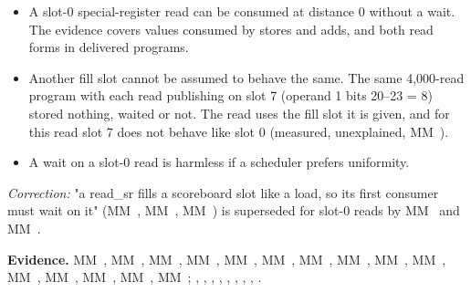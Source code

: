 \begin{itemize}
\item A slot-0 special-register read can be consumed at distance 0 without a wait. The evidence covers  values consumed by stores and adds, and both read forms in delivered programs.
\item Another fill slot cannot be assumed to behave the same. The same 4,000-read program with each read publishing on slot 7
  (operand 1 bits 20–23 = 8) stored nothing, waited or not. The read uses the fill slot it is given, and for this read
  slot 7 does not behave like slot 0 (measured, unexplained, MM~).
\item A wait on a slot-0 read is harmless if a scheduler prefers uniformity.
\end{itemize}

\emph{Correction:} "a read\_sr fills a scoreboard slot like a load, so its first consumer must wait on it" (MM~, MM~,
MM~) is superseded for slot-0 reads by MM~ and MM~.

\textbf{Evidence.} MM~, MM~, MM~, MM~, MM~, MM~, MM~, MM~, MM~, MM~,
MM~, MM~, MM~, MM~, MM~; ,
, , , ,
, , , .
